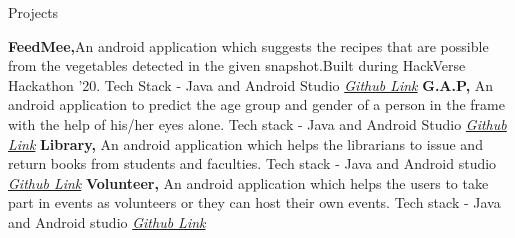 \begin{rubric}{Projects}

\entry* \textbf{FeedMee,}An android application which suggests the recipes that are possible from the vegetables detected in the given snapshot.Built during HackVerse Hackathon '20. Tech Stack - Java and Android Studio  \href{https://github.com/rcs10/FeedMee}{\emph{Github Link}}
\entry* \textbf{G.A.P,} An android application to predict the age group and gender of a person in the frame with the help of his/her eyes alone. Tech stack - Java and Android Studio \href{https://github.com/rcs10/G.A.P}{\emph{Github Link}}
\entry* \textbf{Library,} An android application which helps the librarians to issue and return books from students and faculties.  Tech stack - Java and Android studio \href{https://github.com/rcs10/Library}{\emph{Github Link}}
\entry* \textbf{Volunteer,} An android application which helps the users to take part in events as volunteers or they can host their own events.  Tech stack - Java and Android studio \href{https://github.com/rcs10/Volunteers-App}{\emph{Github Link}}
\end{rubric}